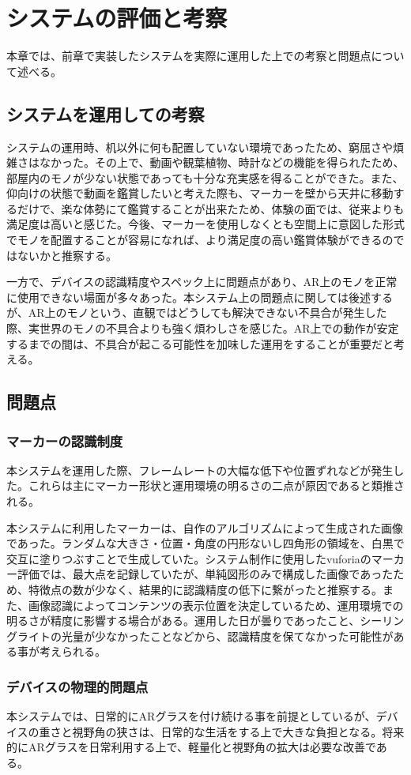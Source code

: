 
\chapter{システムの評価と考察}
\label{chap:systemEvaluation}

本章では、前章で実装したシステムを実際に運用した上での考察と問題点について述べる。

\newpage

\section{システムを運用しての考察}

システムの運用時、机以外に何も配置していない環境であったため、窮屈さや煩雑さはなかった。その上で、動画や観葉植物、時計などの機能を得られたため、部屋内のモノが少ない状態であっても十分な充実感を得ることができた。また、仰向けの状態で動画を鑑賞したいと考えた際も、マーカーを壁から天井に移動するだけで、楽な体勢にて鑑賞することが出来たため、体験の面では、従来よりも満足度は高いと感じた。今後、マーカーを使用しなくとも空間上に意図した形式でモノを配置することが容易になれば、より満足度の高い鑑賞体験ができるのではないかと推察する。

一方で、デバイスの認識精度やスペック上に問題点があり、AR上のモノを正常に使用できない場面が多々あった。本システム上の問題点に関しては後述するが、AR上のモノという、直観ではどうしても解決できない不具合が発生した際、実世界のモノの不具合よりも強く煩わしさを感じた。AR上での動作が安定するまでの間は、不具合が起こる可能性を加味した運用をすることが重要だと考える。

\section{問題点}

\subsection{マーカーの認識制度}

本システムを運用した際、フレームレートの大幅な低下や位置ずれなどが発生した。これらは主にマーカー形状と運用環境の明るさの二点が原因であると類推される。

本システムに利用したマーカーは、自作のアルゴリズムによって生成された画像であった。ランダムな大きさ・位置・角度の円形ないし四角形の領域を、白黒で交互に塗りつぶすことで生成していた。システム制作に使用したvuforiaのマーカー評価では、最大点を記録していたが、単純図形のみで構成した画像であったため、特徴点の数が少なく、結果的に認識精度の低下に繋がったと推察する。また、画像認識によってコンテンツの表示位置を決定しているため、運用環境での明るさが精度に影響する場合がある。運用した日が曇りであったこと、シーリングライトの光量が少なかったことなどから、認識精度を保てなかった可能性がある事が考えられる。

\subsection{デバイスの物理的問題点}

本システムでは、日常的にARグラスを付け続ける事を前提としているが、デバイスの重さと視野角の狭さは、日常的な生活をする上で大きな負担となる。将来的にARグラスを日常利用する上で、軽量化と視野角の拡大は必要な改善である。
